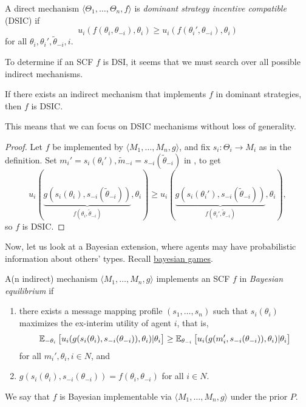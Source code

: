 	\begin{fdef}
		\label{def: dsic}
		A direct mechanism $\langle \Theta_1,\ldots,\Theta_n,f\rangle$ is \emph{dominant strategy incentive compatible} (DSIC) if
		\begin{equation}
			\label{eqn: dsic}
			u_i(f(\theta_i,\theta_{-i}),\theta_i) \ge u_i(f(\theta_i',\theta_{-i}),\theta_i)
		\end{equation}
		for all $\theta_i,\theta_i',\widetilde{\theta}_{-i},i$.
	\end{fdef}

	To determine if an SCF $f$ is DSI, it seems that we must search over all possible indirect mechanisms.

	\begin{ftheo}
		If there exists an indirect mechanism that implements $f$ in dominant strategies, then $f$ is DSIC.
	\end{ftheo}
	This means that we can focus on DSIC mechanisms without loss of generality.
	\begin{proof}
		Let $f$ be implemented by $\langle M_1,\ldots,M_n,g\rangle$, and fix $s_i : \Theta_i \to M_i$ as in the definition. Set $m_i' = s_i(\theta_i'), \widetilde{m}_{-i} = s_{-i}(\widetilde{\theta}_{-i})$ in , to get
		\[ u_i(\underbrace{g(s_i(\theta_i),s_{-i}(\widetilde{\theta}_{-i}))}_{f(\theta_i,\widetilde\theta_{-i})},\theta_i) \ge u_i(\underbrace{g(s_i(\theta_i'),s_{-i}(\widetilde\theta_{-i}))}_{f(\theta_i',\widetilde\theta_{-i})},\theta_i), \]
		so $f$ is DSIC.
	\end{proof}

	Now, let us look at a Bayesian extension, where agents may have probabilistic information about others' types. Recall \hyperref[def: bayesian game]{bayesian games}.

	\begin{fdef}
		A(n indirect) mechanism $\langle M_1,\ldots,M_n,g\rangle$ implements an SCF $f$ in \emph{Bayesian equilibrium} if
		\begin{enumerate}
			\item there exists a message mapping profile $(s_1,\ldots,s_n)$ such that $s_i(\theta_i)$ maximizes the ex-interim utility of agent $i$, that is,
			\[ \mathbb{E}_{-\theta_i} \left[ u_i(g(s_i(\theta_i),s_{-i}(\theta_{-i})),\theta_i) | \theta_i \right] \ge \mathbb{E}_{\theta_{-i}} \left[ u_i(g(m_i',s_{-i}(\theta_{-i})),\theta_i) | \theta_i \right] \]
			for all $m_i',\theta_i,i\in N$, and
			\item $g(s_i(\theta_i),s_{-i}(\theta_{-i})) = f(\theta_i,\theta_{-i})$ for all $i \in N$.
		\end{enumerate}	
		We say that $f$ is Bayesian implementable via $\langle M_1,\ldots,M_n,g\rangle$ under the prior $P$.
	\end{fdef}

